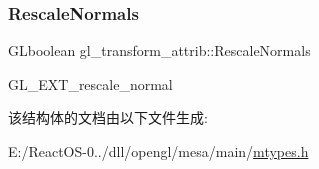 \subsubsection{\texorpdfstring{Rescale\+Normals}{RescaleNormals}}
{\footnotesize\ttfamily G\+Lboolean gl\+\_\+transform\+\_\+attrib\+::\+Rescale\+Normals}

G\+L\+\_\+\+E\+X\+T\+\_\+rescale\+\_\+normal 

该结构体的文档由以下文件生成\+:\begin{DoxyCompactItemize}
\item 
E\+:/\+React\+O\+S-\/0../dll/opengl/mesa/main/\hyperlink{mtypes_8h}{mtypes.\+h}\end{DoxyCompactItemize}

